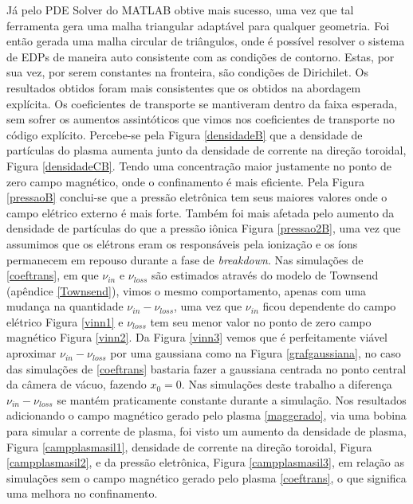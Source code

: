 \documentclass[12pt,oneside,a4paper]{abntex2}
\begin{document}
Já pelo PDE Solver do MATLAB obtive mais sucesso, uma vez que tal ferramenta gera uma malha triangular adaptável para qualquer geometria. 
Foi então gerada uma malha circular de triângulos, onde é possível resolver o sistema de EDPs de maneira auto consistente com as condições de contorno. 
Estas, por sua vez, por serem constantes na fronteira, são condições de Dirichilet. Os resultados obtidos foram mais consistentes que os obtidos na abordagem explícita. Os coeficientes de transporte se mantiveram dentro da faixa esperada, sem sofrer os aumentos assintóticos que vimos nos coeficientes de transporte no código explícito. 
Percebe-se pela Figura \ref{densidadeB} que a densidade de partículas do plasma aumenta junto da densidade de corrente na direção toroidal, Figura \ref{densidadeCB}. Tendo uma concentração maior justamente no ponto de zero campo magnético, onde o confinamento é mais eficiente. Pela Figura \ref{pressaoB} conclui-se que a pressão eletrônica tem seus maiores valores onde o campo elétrico externo é mais forte. 
Também foi mais afetada pelo aumento da densidade de partículas do que a pressão iônica Figura \ref{pressao2B}, uma vez que assumimos que os elétrons eram os responsáveis pela ionização e os íons permanecem em repouso durante a fase de \textit{breakdown}. 
Nas simulações de \ref{coeftrans}, em que $\nu_{in}$ e $ \nu_{loss}$ são estimados através do modelo de Townsend (apêndice \ref{Townsend}), vimos o mesmo comportamento, apenas com uma mudança na quantidade $\nu_{in}-\nu_{loss}$, uma vez que $\nu_{in}$ ficou dependente do campo elétrico Figura \ref{vinn1} e $ \nu_{loss}$ tem seu menor valor no ponto de zero campo magnético Figura \ref{vinn2}. 
Da Figura \ref{vinn3} vemos que é perfeitamente viável aproximar $\nu_{in}-\nu_{loss}$ por uma gaussiana como na Figura \ref{grafgaussiana}, no caso das simulações de \ref{coeftrans} bastaria fazer a gaussiana centrada no ponto central da câmera de vácuo, fazendo $x_0=0$. Nas simulações deste trabalho a diferença $\nu_{in}-\nu_{loss}$ se mantém praticamente constante durante a  simulação. 
Nos resultados adicionando o campo magnético gerado pelo plasma \ref{maggerado}, via uma bobina para simular a corrente de plasma, foi visto um aumento da densidade de plasma, Figura \ref{campplasmasil1}, densidade de corrente na direção toroidal, Figura \ref{campplasmasil2}, e da pressão eletrônica, Figura \ref{campplasmasil3}, em relação as simulações sem o campo magnético gerado pelo plasma \ref{coeftrans}, o que significa uma melhora no confinamento.   
\end{document}

